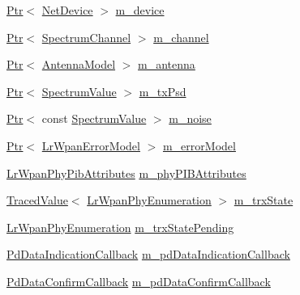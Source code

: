 \begin{DoxyCompactItemize}
\item 
\hyperlink{classns3_1_1Ptr}{Ptr}$<$ \hyperlink{classns3_1_1NetDevice}{Net\+Device} $>$ \hyperlink{classns3_1_1LrWpanPhy_a406001d3cb4da3828837c1c1b4629a9c}{m\+\_\+device}
\item 
\hyperlink{classns3_1_1Ptr}{Ptr}$<$ \hyperlink{classns3_1_1SpectrumChannel}{Spectrum\+Channel} $>$ \hyperlink{classns3_1_1LrWpanPhy_a6ea4a904afe3b256bc001c40efe496e1}{m\+\_\+channel}
\item 
\hyperlink{classns3_1_1Ptr}{Ptr}$<$ \hyperlink{classns3_1_1AntennaModel}{Antenna\+Model} $>$ \hyperlink{classns3_1_1LrWpanPhy_a190f9ce3b27fed0de2be87412387f8ba}{m\+\_\+antenna}
\item 
\hyperlink{classns3_1_1Ptr}{Ptr}$<$ \hyperlink{classns3_1_1SpectrumValue}{Spectrum\+Value} $>$ \hyperlink{classns3_1_1LrWpanPhy_a136f3eddb97dc50b4689df6a36df1f76}{m\+\_\+tx\+Psd}
\item 
\hyperlink{classns3_1_1Ptr}{Ptr}$<$ const \hyperlink{classns3_1_1SpectrumValue}{Spectrum\+Value} $>$ \hyperlink{classns3_1_1LrWpanPhy_a02560969747aa24f7bded61743f5cc37}{m\+\_\+noise}
\item 
\hyperlink{classns3_1_1Ptr}{Ptr}$<$ \hyperlink{classns3_1_1LrWpanErrorModel}{Lr\+Wpan\+Error\+Model} $>$ \hyperlink{classns3_1_1LrWpanPhy_a51ab23fe176708768b6276cdbbd68a06}{m\+\_\+error\+Model}
\item 
\hyperlink{structns3_1_1LrWpanPhyPibAttributes}{Lr\+Wpan\+Phy\+Pib\+Attributes} \hyperlink{classns3_1_1LrWpanPhy_a7f263bedbdeed627f7c5f2dab8e960c8}{m\+\_\+phy\+P\+I\+B\+Attributes}
\item 
\hyperlink{classns3_1_1TracedValue}{Traced\+Value}$<$ \hyperlink{group__lr-wpan_ga6494269d13d45c511a07b7ccbb1de754}{Lr\+Wpan\+Phy\+Enumeration} $>$ \hyperlink{classns3_1_1LrWpanPhy_a316704a4eb96e04f4b960ba3577fe0ce}{m\+\_\+trx\+State}
\item 
\hyperlink{group__lr-wpan_ga6494269d13d45c511a07b7ccbb1de754}{Lr\+Wpan\+Phy\+Enumeration} \hyperlink{classns3_1_1LrWpanPhy_a84647014f5242767e3358a6a851c81a7}{m\+\_\+trx\+State\+Pending}
\item 
\hyperlink{group__lr-wpan_ga5942bd2136b995f9104db9cfc311ace3}{Pd\+Data\+Indication\+Callback} \hyperlink{classns3_1_1LrWpanPhy_a94de3241a0050cc21f5a57fdbc951c9e}{m\+\_\+pd\+Data\+Indication\+Callback}
\item 
\hyperlink{group__lr-wpan_ga0cba923353248fc2a8dc81303c6d5e35}{Pd\+Data\+Confirm\+Callback} \hyperlink{classns3_1_1LrWpanPhy_a6f736d7cb72829ef100315c1b8f6ea05}{m\+\_\+pd\+Data\+Confirm\+Callback}

\end{DoxyCompactItemize}
